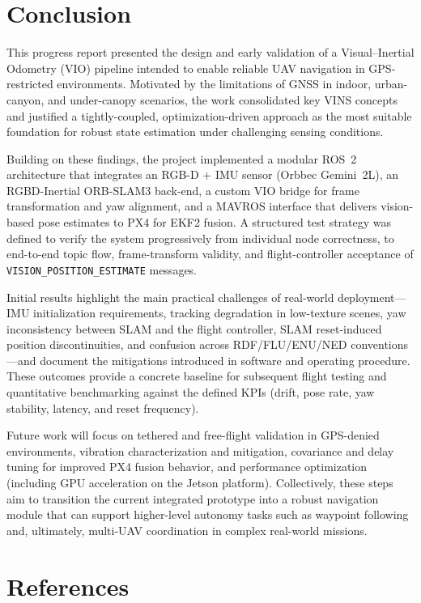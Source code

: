 \section{Conclusion}
This progress report presented the design and early validation of a Visual--Inertial Odometry (VIO) pipeline intended to enable reliable UAV navigation in GPS-restricted environments. Motivated by the limitations of GNSS in indoor, urban-canyon, and under-canopy scenarios, the work consolidated key VINS concepts and justified a tightly-coupled, optimization-driven approach as the most suitable foundation for robust state estimation under challenging sensing conditions.

Building on these findings, the project implemented a modular ROS~2 architecture that integrates an RGB-D + IMU sensor (Orbbec Gemini~2L), an RGBD-Inertial ORB-SLAM3 back-end, a custom VIO bridge for frame transformation and yaw alignment, and a MAVROS interface that delivers vision-based pose estimates to PX4 for EKF2 fusion. A structured test strategy was defined to verify the system progressively from individual node correctness, to end-to-end topic flow, frame-transform validity, and flight-controller acceptance of \texttt{VISION\_POSITION\_ESTIMATE} messages.

Initial results highlight the main practical challenges of real-world deployment---IMU initialization requirements, tracking degradation in low-texture scenes, yaw inconsistency between SLAM and the flight controller, SLAM reset-induced position discontinuities, and confusion across RDF/FLU/ENU/NED conventions---and document the mitigations introduced in software and operating procedure. These outcomes provide a concrete baseline for subsequent flight testing and quantitative benchmarking against the defined KPIs (drift, pose rate, yaw stability, latency, and reset frequency).

Future work will focus on tethered and free-flight validation in GPS-denied environments, vibration characterization and mitigation, covariance and delay tuning for improved PX4 fusion behavior, and performance optimization (including GPU acceleration on the Jetson platform). Collectively, these steps aim to transition the current integrated prototype into a robust navigation module that can support higher-level autonomy tasks such as waypoint following and, ultimately, multi-UAV coordination in complex real-world missions.

\section{References}
\begingroup
\noindent
\printbibliography[heading=none]
\endgroup